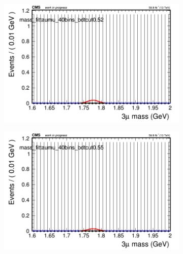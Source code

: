\begin{figure}[H]
\begin{subfigure}{0.2\textwidth}
        \caption{}
    \end{subfigure}
    \begin{subfigure}{0.2\textwidth}
        \includegraphics[width=\textwidth]{power_law/plots/taumu/massfit_taumu_40bins_bdtcut0.52.png}
        \caption{}
    \end{subfigure}
    \begin{subfigure}{0.2\textwidth}
        \includegraphics[width=\textwidth]{power_law/plots/taumu/massfit_taumu_40bins_bdtcut0.55.png}
        \caption{}
    \end{subfigure}
    \begin{subfigure}{0.2\textwidth}

\end{subfigure}
\end{figure}
